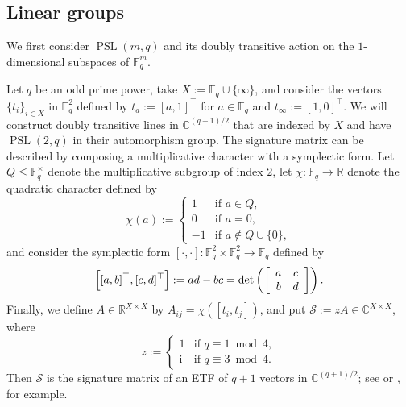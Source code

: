 \subsection{Linear groups}
\label{subsec:linear}

We first consider $\operatorname{PSL}(m,q)$ and its doubly transitive action on the $1$-dimensional subspaces of $\mathbb{F}_q^m$.

\begin{example}
\label{ex.Paley conference}
Let $q$ be an odd prime power, take $X:=\mathbb{F}_q\cup\{\infty\}$, and consider the vectors $\{t_i\}_{i\in X}$ in $\mathbb{F}_q^2$ defined by $t_a:=[a,1]^\top$ for $a\in\mathbb{F}_q$
and $t_\infty:=[1,0]^\top$.
We will construct doubly transitive lines in $\mathbb{C}^{(q+1)/2}$ that are indexed by $X$ and have $\operatorname{PSL}(2,q)$ in their automorphism group.
The signature matrix can be described by composing a multiplicative character with a symplectic form.
Let $Q\leq\mathbb{F}_q^\times$ denote the multiplicative subgroup of index $2$, let $\chi\colon\mathbb{F}_q\to\mathbb{R}$ denote the quadratic character defined by
\[
\chi(a)
:=
\begin{cases}
1 & \text{if }a \in Q, \\
0 & \text{if }a = 0, \\
-1 & \text{if }a \not\in Q \cup\{0\},
\end{cases}
\]
and consider the symplectic form $[\cdot,\cdot]\colon\mathbb{F}_q^2\times\mathbb{F}_q^2\to\mathbb{F}_q$ defined by
\[
\Bigl[ [ a,b]^\top, [c,d]^\top \Bigr]:=ad-bc=\operatorname{det}\left(\left[\begin{array}{cc}a&c\\b&d\end{array}\right]\right).
\]
Finally, we define $A\in\mathbb{R}^{X\times X}$ by $A_{ij}=\chi([t_i,t_j])$, and put $\mathcal{S}:=z A\in\mathbb{C}^{X\times X}$, where
\[
z
:=
\begin{cases}
1 & \text{if } q \equiv 1 \bmod 4, \\
\mathrm{i} & \text{if } q \equiv 3 \bmod 4.
\end{cases}
\]
Then $\mathcal{S}$ is the signature matrix of an ETF of $q+1$ vectors in $\mathbb{C}^{(q+1)/2}$; see \cite{Renes:07} or \cite[p.~67]{Zauner:99}, for example.


\end{example}
